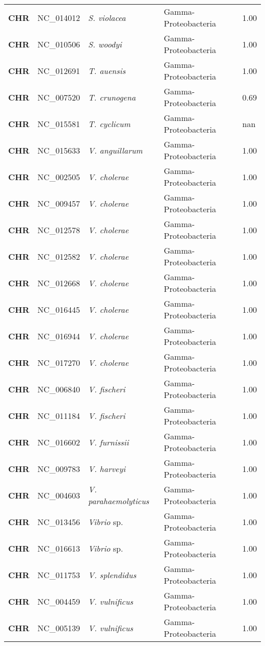 \begin{adjustwidth}{-3cm}{2cm}
{\begin{supertabular}{>{\bfseries}l|p{0.1\textwidth}p{0.14\textwidth}l|l}
CHR & NC\_014012 & \textit{S. violacea} & Gamma-Proteobacteria & 1.00\\
CHR & NC\_010506 & \textit{S. woodyi} & Gamma-Proteobacteria & 1.00\\
CHR & NC\_012691 & \textit{T. auensis} & Gamma-Proteobacteria & 1.00\\
CHR & NC\_007520 & \textit{T. crunogena} & Gamma-Proteobacteria & 0.69\\
CHR & NC\_015581 & \textit{T. cyclicum} & Gamma-Proteobacteria & nan\\
CHR & NC\_015633 & \textit{V. anguillarum} & Gamma-Proteobacteria & 1.00\\
CHR & NC\_002505 & \textit{V. cholerae} & Gamma-Proteobacteria & 1.00\\
CHR & NC\_009457 & \textit{V. cholerae} & Gamma-Proteobacteria & 1.00\\
CHR & NC\_012578 & \textit{V. cholerae} & Gamma-Proteobacteria & 1.00\\
CHR & NC\_012582 & \textit{V. cholerae} & Gamma-Proteobacteria & 1.00\\
CHR & NC\_012668 & \textit{V. cholerae} & Gamma-Proteobacteria & 1.00\\
CHR & NC\_016445 & \textit{V. cholerae} & Gamma-Proteobacteria & 1.00\\
CHR & NC\_016944 & \textit{V. cholerae} & Gamma-Proteobacteria & 1.00\\
CHR & NC\_017270 & \textit{V. cholerae} & Gamma-Proteobacteria & 1.00\\
CHR & NC\_006840 & \textit{V. fischeri} & Gamma-Proteobacteria & 1.00\\
CHR & NC\_011184 & \textit{V. fischeri} & Gamma-Proteobacteria & 1.00\\
CHR & NC\_016602 & \textit{V. furnissii} & Gamma-Proteobacteria & 1.00\\
CHR & NC\_009783 & \textit{V. harveyi} & Gamma-Proteobacteria & 1.00\\
CHR & NC\_004603 & \textit{V. parahaemolyticus} & Gamma-Proteobacteria & 1.00\\
CHR & NC\_013456 & \textit{Vibrio} sp. & Gamma-Proteobacteria & 1.00\\
CHR & NC\_016613 & \textit{Vibrio} sp. & Gamma-Proteobacteria & 1.00\\
CHR & NC\_011753 & \textit{V. splendidus} & Gamma-Proteobacteria & 1.00\\
CHR & NC\_004459 & \textit{V. vulnificus} & Gamma-Proteobacteria & 1.00\\
CHR & NC\_005139 & \textit{V. vulnificus} & Gamma-Proteobacteria & 1.00\\

\end{supertabular}}
\end{adjustwidth}
